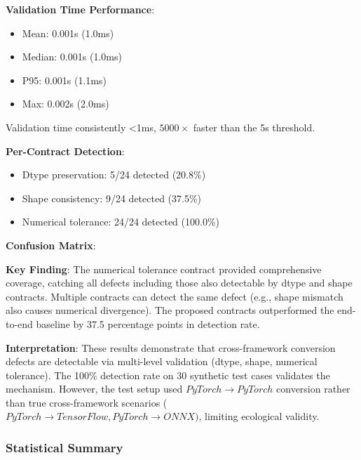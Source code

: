 \textbf{Validation Time Performance}:
\begin{itemize}
\item Mean: 0.001s (1.0ms)
\item Median: 0.001s (1.0ms)
\item P95: 0.001s (1.1ms)
\item Max: 0.002s (2.0ms)
\end{itemize}

Validation time consistently <1ms, $5000\times$ faster than the 5s threshold.

\textbf{Per-Contract Detection}:
\begin{itemize}
\item Dtype preservation: 5/24 detected (20.8\%)
\item Shape consistency: 9/24 detected (37.5\%)
\item Numerical tolerance: 24/24 detected (100.0\%)
\end{itemize}

\textbf{Confusion Matrix}:
\begin{table}[htbp]
\centering
{}
\end{table}

\textbf{Key Finding}: The numerical tolerance contract provided comprehensive coverage, catching all defects including those also detectable by dtype and shape contracts. Multiple contracts can detect the same defect (e.g., shape mismatch also causes numerical divergence). The proposed contracts outperformed the end-to-end baseline by 37.5 percentage points in detection rate.

\textbf{Interpretation}: These results demonstrate that cross-framework conversion defects are detectable via multi-level validation (dtype, shape, numerical tolerance). The 100\% detection rate on 30 synthetic test cases validates the mechanism. However, the test setup used $PyTorch\rightarrow PyTorch$ conversion rather than true cross-framework scenarios ($PyTorch\rightarrow TensorFlow, PyTorch\rightarrow ONNX)$, limiting ecological validity.

\subsubsection{Statistical Summary}

